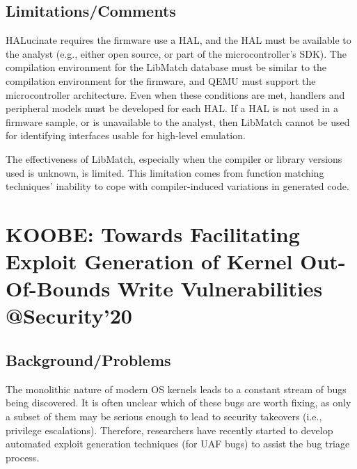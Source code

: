 \subsection{Limitations/Comments}
HALucinate requires the firmware use a HAL, and the HAL must be available to the analyst (e.g., either open source, or part of the microcontroller’s SDK). The compilation environment for the LibMatch database must be similar to the compilation environment for the firmware, and QEMU must support the microcontroller architecture.  Even when these conditions are met, handlers and peripheral models must be developed for each HAL.  If a HAL is not used in a firmware sample, or is unavailable to the analyst, then LibMatch cannot be used for identifying interfaces usable for high-level emulation. 

The effectiveness of LibMatch, especially when the compiler or library versions used is unknown, is limited. This limitation comes from function matching techniques’ inability to cope with compiler-induced variations in generated code. 
\newpage
\section{KOOBE: Towards Facilitating Exploit Generation of Kernel Out-Of-Bounds Write Vulnerabilities @Security'20}
\subsection{Background/Problems}
The monolithic nature of modern OS kernels leads to a constant stream of bugs being discovered. It is often unclear which of these bugs are worth fixing, as only a subset of them may be serious enough to lead to security takeovers (i.e., privilege escalations). Therefore, researchers have recently started to develop automated exploit generation techniques (for UAF bugs) to assist the bug triage process. 
